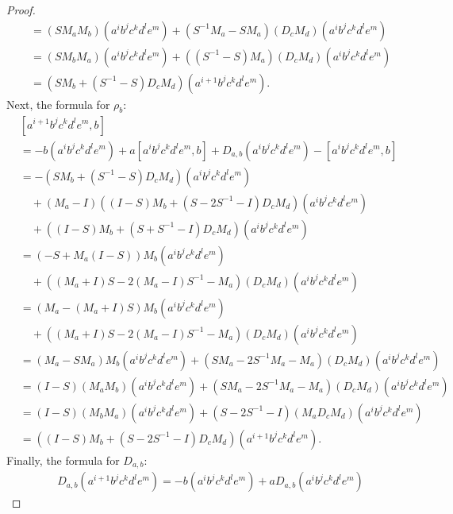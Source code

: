 \documentclass{amsart}
\theoremstyle{plain}
\theoremstyle{definition}
\begin{document}
\begin{proof}
\begin{align*}
  &=
  ( S M_a M_b )
  ( a^i b^j c^k d^l e^m )
  +
  ( S^{-1} M_a - S M_a )
  ( D_c M_d )
  ( a^i b^j c^k d^l e^m )
  \\
  &=
  ( S M_b M_a )
  ( a^i b^j c^k d^l e^m )
  +
  ( ( S^{-1} - S ) M_a )
  ( D_c M_d )
  ( a^i b^j c^k d^l e^m )
  \\
  &=
  (
  S M_b +  (  S^{-1} - S ) D_c M_d
  )
  ( a^{i+1} b^j c^k d^l e^m ).
  \end{align*}
Next, the formula for $\rho_b$:
  \allowdisplaybreaks
  \begin{align*}
  &
  [ a^{i+1} b^j c^k d^l e^m , b ]
  \\
  &=
  -
  b ( a^i b^j c^k d^l e^m )
  +
  a [ a^i b^j c^k d^l e^m, b ]
  +
  D_{a,b} ( a^i b^j c^k d^l e^m )
  -
  [ a^i b^j c^k d^l e^m, b ]
  \\
  &=
  -
  ( S M_b + ( S^{-1} - S ) D_c M_d )
  ( a^i b^j c^k d^l e^m )
  \\
  &\quad
  +
  ( M_a - I )
  (
  ( I - S ) M_b + ( S - 2 S^{-1} - I ) D_c M_d
  )
  ( a^i b^j c^k d^l e^m )
  \\
  &\quad
  +
  (
  ( I - S ) M_b + ( S + S^{-1} - I ) D_c M_d
  )
  ( a^i b^j c^k d^l e^m )
  \\
  &=
  ( - S + M_a (I - S) ) M_b
  ( a^i b^j c^k d^l e^m )
  \\
  &\quad
  +
  ( ( M_a + I ) S - 2 ( M_a - I ) S^{-1} - M_a )
  ( D_c M_d )
  (a^i b^j c^k d^l e^m)
  \\
  &=
  ( M_a - ( M_a + I ) S ) M_b
  ( a^i b^j c^k d^l e^m )
  \\
  &\quad
  +
  ( ( M_a + I ) S - 2 ( M_a - I ) S^{-1} - M_a )
  ( D_c M_d )
  ( a^i b^j c^k d^l e^m )
  \\
  &=
  ( M_a - S M_a ) M_b
  ( a^i b^j c^k d^l e^m )
  +
  ( S M_a - 2 S^{-1} M_a - M_a ) ( D_c M_d )
  ( a^i b^j c^k d^l e^m )
  \\
  &=
  ( I - S ) ( M_a M_b )
  ( a^i b^j c^k d^l e^m )
  +
  ( S M_a - 2 S^{-1} M_a - M_a )
  ( D_c M_d )
  ( a^i b^j c^k d^l e^m )
  \\
  &=
  ( I - S ) ( M_b M_a )
  ( a^i b^j c^k d^l e^m )
  +
  ( S - 2 S^{-1} - I ) ( M_a D_c M_d )
  ( a^i b^j c^k d^l e^m )
  \\
  &=
  (
  ( I - S ) M_b + ( S - 2 S^{-1} - I ) D_c M_d
  )
  ( a^{i+1} b^j c^k d^l e^m ).
  \end{align*}
Finally, the formula for $D_{a,b}$:
  \allowdisplaybreaks
  \begin{align*}
  &
  D_{a,b} ( a^{i+1} b^j c^k d^l e^m )
  =
  - b ( a^i b^j c^k d^l e^m ) + a D_{a,b} ( a^i b^j c^k d^l e^m )

\end{align*}
\end{proof}
\end{document}
